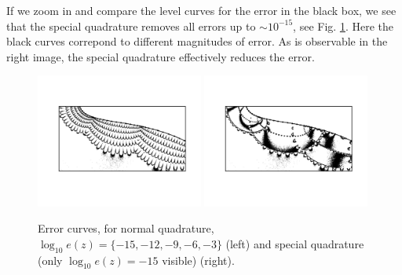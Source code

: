 \documentclass[a4paper,10pt]{article}
\begin{document}
If we zoom in and compare the level curves for the error in the black box, we see that the special quadrature removes all errors up to $\sim 10^{-15}$, see Fig. \ref{fig:levelcurves}. Here the black curves correpond to different magnitudes of error. As is observable in the right image, the special quadrature effectively reduces the error.
\begin{figure}[ht]
    \begin{center}
        \includegraphics[width=0.49\textwidth]{Graphics/contour_panels35.png}
        \includegraphics[width =0.49\textwidth]{Graphics/contour_SQ_panels35.png}
    \end{center}
    \caption{Error curves, for normal quadrature, $\log_{10} e(z) = \{ -15,-12,-9,-6, -3 \}$ (left) and special quadrature (only $\log_{10} e(z) = -15$ visible) (right).}
    \label{fig:levelcurves}
\end{figure}
\FloatBarrier
\end{document}
